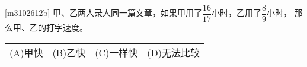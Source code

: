 [m3102612b]\quad
甲、乙两人录人同一篇文章，如果甲用了$\dfrac{16}{17}$小时，乙用了$\dfrac{8}{9}$小时，
那么甲、乙的打字速度。 \par
\hspace{7em}
\begin{tabular}{llll}
    (A)\quad 甲快 &
    (B)\quad 乙快 &
    (C)\quad 一样快 &
    (D)\quad 无法比较
\end{tabular}
\par